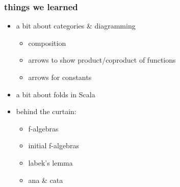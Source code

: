 \documentclass[include/preamble.tex]{subfiles}
\begin{document}
\begin{frame}
  \frametitle{things we learned}
  \begin{itemize}
  \item a bit about categories \& diagramming
    \begin{itemize}
    \item composition
    \item arrows to show product/coproduct of functions
    \item arrows for constants
    \end{itemize}
    \vspace{1em}
  \item a bit about folds in Scala
    \pause
    \vspace{1em}
  \item behind the curtain:
    \begin{itemize}
    \item f-algebras
    \item initial f-algebras
    \item labek's lemma
    \item ana \& cata
    \end{itemize}
  \end{itemize}
\end{frame}
\end{document}
